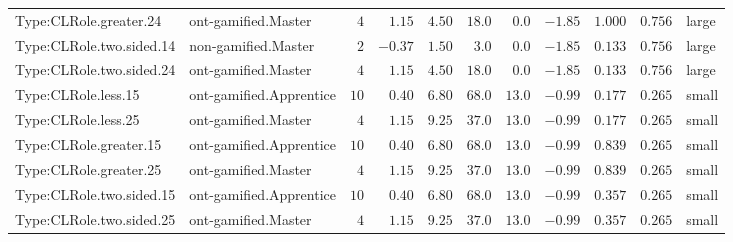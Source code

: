 \documentclass[6pt,a4paper]{article}
\begin{document}
{\begin{longtable}{llrrrrrrrrl}
Type:CLRole.greater.24&ont-gamified.Master&$ 4$&$ 1.15$&$ 4.50$&$ 18.0$&$ 0.0$&$-1.85$&$1.000$&$0.756$&large\tabularnewline
Type:CLRole.two.sided.14&non-gamified.Master&$ 2$&$-0.37$&$ 1.50$&$  3.0$&$ 0.0$&$-1.85$&$0.133$&$0.756$&large\tabularnewline
Type:CLRole.two.sided.24&ont-gamified.Master&$ 4$&$ 1.15$&$ 4.50$&$ 18.0$&$ 0.0$&$-1.85$&$0.133$&$0.756$&large\tabularnewline
Type:CLRole.less.15&ont-gamified.Apprentice&$10$&$ 0.40$&$ 6.80$&$ 68.0$&$13.0$&$-0.99$&$0.177$&$0.265$&small\tabularnewline
Type:CLRole.less.25&ont-gamified.Master&$ 4$&$ 1.15$&$ 9.25$&$ 37.0$&$13.0$&$-0.99$&$0.177$&$0.265$&small\tabularnewline
Type:CLRole.greater.15&ont-gamified.Apprentice&$10$&$ 0.40$&$ 6.80$&$ 68.0$&$13.0$&$-0.99$&$0.839$&$0.265$&small\tabularnewline
Type:CLRole.greater.25&ont-gamified.Master&$ 4$&$ 1.15$&$ 9.25$&$ 37.0$&$13.0$&$-0.99$&$0.839$&$0.265$&small\tabularnewline
\newpage
Type:CLRole.two.sided.15&ont-gamified.Apprentice&$10$&$ 0.40$&$ 6.80$&$ 68.0$&$13.0$&$-0.99$&$0.357$&$0.265$&small\tabularnewline
Type:CLRole.two.sided.25&ont-gamified.Master&$ 4$&$ 1.15$&$ 9.25$&$ 37.0$&$13.0$&$-0.99$&$0.357$&$0.265$&small\tabularnewline
\hline
\end{longtable}}
\end{document}
